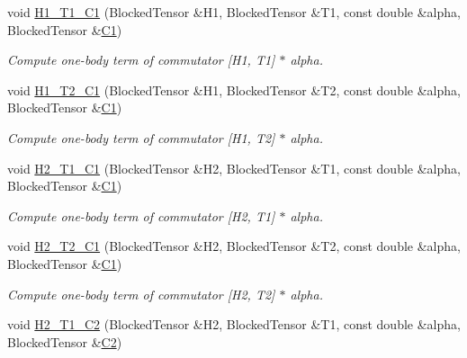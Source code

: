 \begin{DoxyCompactItemize}
\item 
void \mbox{\hyperlink{classforte_1_1_d_s_r_g___m_r_p_t_a6e6d66cdfd06fce5cda302cc25ceda32}{H1\+\_\+\+T1\+\_\+\+C1}} (Blocked\+Tensor \&H1, Blocked\+Tensor \&T1, const double \&alpha, Blocked\+Tensor \&\mbox{\hyperlink{namespaceforte_abe00ec86d0015c0f2b6ac298c6e428e4a1a2ddc2db4693cfd16d534cde5572cc1}{C1}})
\begin{DoxyCompactList}\small\item\em Compute one-\/body term of commutator \mbox{[}H1, T1\mbox{]} $\ast$ alpha. \end{DoxyCompactList}\item 
void \mbox{\hyperlink{classforte_1_1_d_s_r_g___m_r_p_t_a6de48bc90d339cbfc5d6d6ff9d15f07d}{H1\+\_\+\+T2\+\_\+\+C1}} (Blocked\+Tensor \&H1, Blocked\+Tensor \&T2, const double \&alpha, Blocked\+Tensor \&\mbox{\hyperlink{namespaceforte_abe00ec86d0015c0f2b6ac298c6e428e4a1a2ddc2db4693cfd16d534cde5572cc1}{C1}})
\begin{DoxyCompactList}\small\item\em Compute one-\/body term of commutator \mbox{[}H1, T2\mbox{]} $\ast$ alpha. \end{DoxyCompactList}\item 
void \mbox{\hyperlink{classforte_1_1_d_s_r_g___m_r_p_t_a869a5f60f25b70d36a26e6ed16c165d3}{H2\+\_\+\+T1\+\_\+\+C1}} (Blocked\+Tensor \&H2, Blocked\+Tensor \&T1, const double \&alpha, Blocked\+Tensor \&\mbox{\hyperlink{namespaceforte_abe00ec86d0015c0f2b6ac298c6e428e4a1a2ddc2db4693cfd16d534cde5572cc1}{C1}})
\begin{DoxyCompactList}\small\item\em Compute one-\/body term of commutator \mbox{[}H2, T1\mbox{]} $\ast$ alpha. \end{DoxyCompactList}\item 
void \mbox{\hyperlink{classforte_1_1_d_s_r_g___m_r_p_t_ab025b7eb9df9fdad69a3de7dca43ac9b}{H2\+\_\+\+T2\+\_\+\+C1}} (Blocked\+Tensor \&H2, Blocked\+Tensor \&T2, const double \&alpha, Blocked\+Tensor \&\mbox{\hyperlink{namespaceforte_abe00ec86d0015c0f2b6ac298c6e428e4a1a2ddc2db4693cfd16d534cde5572cc1}{C1}})
\begin{DoxyCompactList}\small\item\em Compute one-\/body term of commutator \mbox{[}H2, T2\mbox{]} $\ast$ alpha. \end{DoxyCompactList}\item 
void \mbox{\hyperlink{classforte_1_1_d_s_r_g___m_r_p_t_a2734af50d9ee05d68aa6637ed00dbbbf}{H2\+\_\+\+T1\+\_\+\+C2}} (Blocked\+Tensor \&H2, Blocked\+Tensor \&T1, const double \&alpha, Blocked\+Tensor \&\mbox{\hyperlink{namespaceforte_abe00ec86d0015c0f2b6ac298c6e428e4af1a543f5a2c5d49bc5dde298fcf716e4}{C2}})

\end{DoxyCompactItemize}
